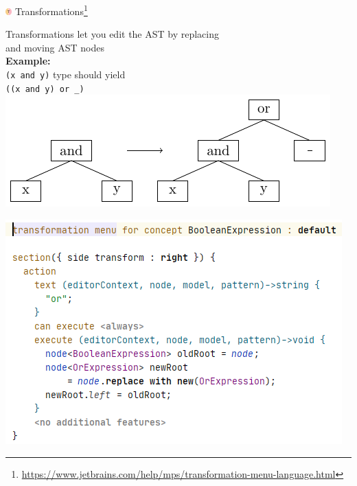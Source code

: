 	\begin{frame}{\includegraphics[height=0.25cm]{graphics/transformation.png} Transformations\footnote{\url{https://www.jetbrains.com/help/mps/transformation-menu-language.html}}}
	\begin{minipage}{0.52\textwidth}
		Transformations let you edit the AST by replacing \\
		and moving AST nodes\\
		
		\textbf{Example:}\\
		\texttt{(x and y)} type  should yield \\
		\texttt{((x and y) or \_)}\\
		\includegraphics[height=0.4\textheight]{tikz/transformation.pdf}
	\end{minipage}
	\begin{minipage}{0.4\textwidth}
		\includegraphics[height=0.75\textheight]{illustrations/transformation.png}
	\end{minipage}
	\end{frame}

